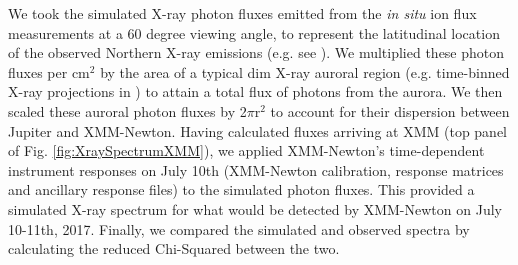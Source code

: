 \documentclass[draft]{agujournal2018}
\begin{document}
We took the simulated X-ray photon fluxes emitted from the \textit{in situ} ion flux measurements at a 60 degree viewing angle, to represent the latitudinal location of the observed Northern X-ray emissions (e.g. see \citet{gladstone2002,dunn2017}).
We multiplied these photon fluxes per cm$^2$ by the area of a typical dim X-ray auroral region (e.g. time-binned X-ray projections in \citet{dunn2016}) to attain a total flux of photons from the aurora.
We then scaled these auroral photon fluxes by 2$\pi$r$^2$ to account for their dispersion between Jupiter and XMM-Newton.
Having calculated fluxes arriving at XMM (top panel of Fig. \ref{fig:XraySpectrumXMM}), we applied XMM-Newton’s time-dependent instrument responses on July 10th (XMM-Newton calibration, response matrices and ancillary response files) to the simulated photon fluxes.
This provided a simulated X-ray spectrum for what would be detected by XMM-Newton on July 10-11th, 2017.
Finally, we compared the simulated and observed spectra by calculating the reduced Chi-Squared between the two.
\end{document}
